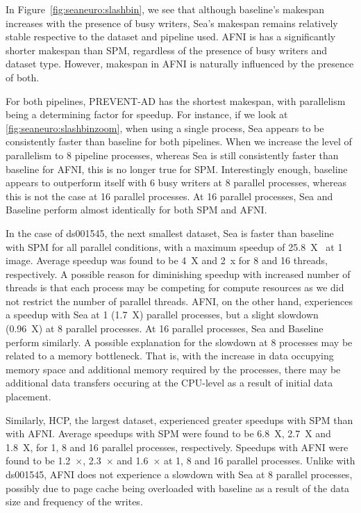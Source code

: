 In Figure~\ref{fig:seaneuro:slashbin}, we see that although baseline's makespan increases with the presence of busy writers,
Sea's makespan remains relatively stable respective to the dataset and pipeline used. AFNI is has a significantly shorter makespan
than SPM, regardless of the presence of busy writers and dataset type. However, makespan in AFNI is naturally influenced by the presence of both.

For both pipelines, PREVENT-AD has the shortest makespan, with parallelism being a determining factor for speedup. For instance, if we look
at \ref{fig:seaneuro:slashbinzoom}, when using a single process, Sea appears to be consistently faster than baseline for both pipelines.
When we increase the level of parallelism to 8 pipeline processes, whereas Sea is still consistently faster than baseline for AFNI, this
is no longer true for SPM. Interestingly enough, baseline appears to outperform itself with 6 busy writers at 8 parallel processes, whereas
this is not the case at 16 parallel processes. At 16 parallel processes, Sea and Baseline perform almost identically for both SPM and AFNI.

In the case of ds001545, the next smallest dataset, Sea is faster than baseline with SPM for all parallel conditions, with a maximum speedup of 25.8~X~ at 1 image.
Average speedup was found to be 4~X and 2~x for 8 and 16 threads, respectively. A possible reason for diminishing speedup with increased number of 
threads is that each process may be competing for compute resources as we did not restrict the number of parallel threads.
AFNI, on the other hand, experiences a speedup with Sea at 1 (1.7~X) parallel processes, but a slight slowdown (0.96~X) at 8 parallel processes.
At 16 parallel processes, Sea and Baseline perform similarly. A possible explanation for the slowdown at 8 processes may be related to a memory bottleneck. That is, with the increase in data occupying memory space and additional memory required by the processes, there may be additional data transfers occuring at the CPU-level as a result of initial data placement.

Similarly, HCP, the largest dataset, experienced greater speedups with SPM than with AFNI. Average speedups with
SPM were found to be 6.8~X, 2.7~X and 1.8~X, for 1, 8 and 16 parallel processes, respectively. Speedups with AFNI
were found to be 1.2~$\times$, 2.3~$\times$ and 1.6~$\times$ at 1, 8 and 16 parallel processes. Unlike with ds001545, AFNI does not experience a slowdown with Sea at 8 parallel processes, possibly due to page cache being overloaded with baseline as a result of the data size and frequency of the writes.



